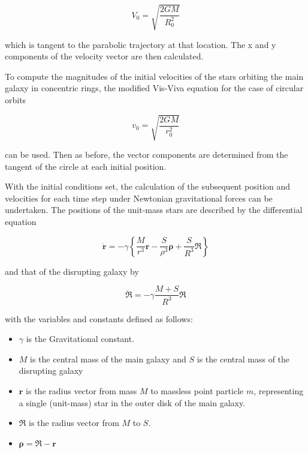 \documentclass[11pt]{article}
\begin{document}
\begin{equation}
V_0= \sqrt{\frac{2GM}{R_0^2}}
\label{V0_eqn}
\end{equation}

which is tangent to the parabolic trajectory at that location.  The x and y components of the velocity vector are then calculated.

To compute the magnitudes of the initial velocities of the stars orbiting the main galaxy in concentric rings, the modified Vis-Viva equation for the case of circular orbits 

\begin{equation}
v_0= \sqrt{\frac{2GM}{r_0^2}}
\end{equation}

can be used.  Then as before, the vector components are determined from the tangent of the circle at each initial position.

With the initial conditions set, the calculation of the subsequent position and velocities for each time step under Newtonian gravitational forces can be undertaken.  The positions of the unit-mass stars are described by the differential equation

\begin{equation}
\ddot{\mathbf{r}} = -\gamma \left\{ \frac{M}{r^3}\mathbf{r} -\frac{S}{\rho^3}\boldsymbol{\rho} + \frac{S}{R^3}\boldsymbol\Re \right\}
\label{star_eqn}
\end{equation}

and that of the disrupting galaxy by

\begin{equation}
\ddot{\boldsymbol\Re} = -\gamma \frac{M+S}{R^3}\boldsymbol\Re
\label{disruptor_eqn}
\end{equation}

with the variables and constants defined as follows:

\begin{itemize}
\item $\gamma$ is the Gravitational constant.
\item $M$ is the central mass of the main galaxy and $S$ is the central mass of the disrupting galaxy
\item $\mathbf{r}$ is the radius vector from mass $M$ to massless point particle $m$, representing a single (unit-mass) star in the outer disk of the main galaxy.
\item $\boldsymbol\Re$ is the radius vector from $M$ to $S$.
\item $\boldsymbol{\rho} = \boldsymbol{\Re} - \boldsymbol{r}$
\end{itemize}
\end{document}
